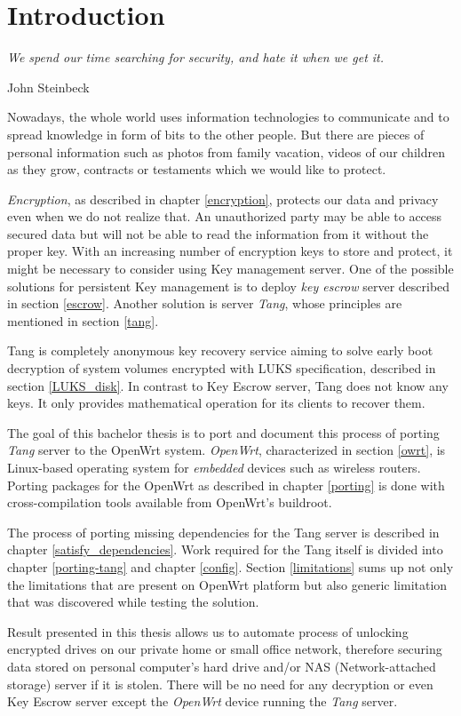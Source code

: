 \chapter{Introduction}\label{introduction}
\epigraph{\it We spend our time searching for security, and hate it when we get it.}{{John Steinbeck}\cite{quote}}

Nowadays, the whole world uses information technologies to communicate and to spread knowledge in form of bits to the other people.
But there are pieces of personal information such as photos from family vacation, videos of our children as they grow, contracts or testaments which we would like to protect.

{\it Encryption}, as described in chapter \ref{encryption}, protects our data and privacy even when we do not realize that.
An unauthorized party may be able to access secured data but will not be able to read the information from it without the proper key.
With an increasing number of encryption keys to store and protect, it might be necessary to consider using Key management server.
One of the possible solutions for persistent Key management is to deploy {\it key escrow} server described in section \ref{escrow}.
Another solution is server {\it Tang}, whose principles are mentioned in section \ref{tang}.

Tang is completely anonymous key recovery service aiming to solve early boot decryption of system volumes encrypted with LUKS specification, described in section \ref{LUKS_disk}.
In contrast to Key Escrow server, Tang does not know any keys.
It only provides mathematical operation for its clients to recover them.

The goal of this bachelor thesis is to port and document this process of porting {\it Tang} server to the OpenWrt system.
{\it OpenWrt}, characterized in section \ref{owrt}, is Linux-based operating system for {\it embedded} devices such as wireless routers.
Porting packages for the OpenWrt as described in chapter \ref{porting} is done with cross-compilation tools available from OpenWrt's buildroot.

The process of porting missing dependencies for the Tang server is described in chapter \ref{satisfy_dependencies}.
Work required for the Tang itself is divided into chapter \ref{porting-tang} and chapter \ref{config}.
Section \ref{limitations} sums up not only the limitations that are present on OpenWrt platform but also generic limitation that was discovered while testing the solution.

Result presented in this thesis allows us to automate process of unlocking encrypted drives on our private home or small office network, therefore securing data stored on personal computer's hard drive and/or NAS (Network-attached storage) server if it is stolen.
There will be no need for any decryption or even Key Escrow server except the {\it OpenWrt} device running the {\it Tang} server.
